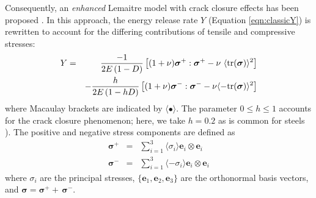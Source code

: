 \documentclass[sn-mathphys,Numbered]{sn-jnl}%
\newcommand{\bb}{\boldsymbol}
\begin{document}
Consequently, an \emph{enhanced} Lemaitre model with crack closure effects has been proposed \cite{pires_issues_2005,teixeira_ductile_2010}.
In this approach, the energy release rate $Y$ (Equation \ref{eqn:classicY}) is rewritten to account for the differing contributions of tensile and compressive stresses:
\begin{eqnarray}
	Y &=&
	\frac{-1}{2E\left(1-D\right)}
	\left[(1 + \nu) \bb{\sigma}^+ : \bb{\sigma}^+ - \nu\ \langle \text{tr}(\boldsymbol{\sigma})\rangle^2\right] \notag \\
	&&-\frac{h}{2E\left(1-hD\right)}
	\left[(1 + \nu)\bb{\sigma}^- : \bb{\sigma}^- -\nu \langle -\text{tr}(\boldsymbol{\sigma})\rangle^2\right]
\end{eqnarray}
where Macaulay brackets are indicated by $\langle \bullet \rangle$.
The parameter $0\le h\le1$ accounts for the crack closure phenomenon; here, we take $h = 0.2$ as is common for steels \cite{desmorat_modeling_2008,lemaitre_course_1996,bouchard_enhanced_2011}). 
The positive and negative stress components are defined as
\begin{eqnarray}
	\boldsymbol{\sigma}^+&=&\sum_{i=1}^{3} \langle{\sigma}_i \rangle\bb{e}_i\otimes\bb{e}_i	\\
	\boldsymbol{\sigma}^-&=&\sum_{i=1}^{3}\langle{-{\sigma}}_i\rangle\bb{e}_i\otimes\bb{e}_i
\end{eqnarray}
where ${\sigma}_i$ are the principal stresses, $\{\bb{e}_1,\bb{e}_2,\bb{e}_3\}$ are the orthonormal basis vectors, and $\boldsymbol{\sigma} = \boldsymbol{\sigma}^+ + \, \boldsymbol{\sigma}^-$.
\end{document}
